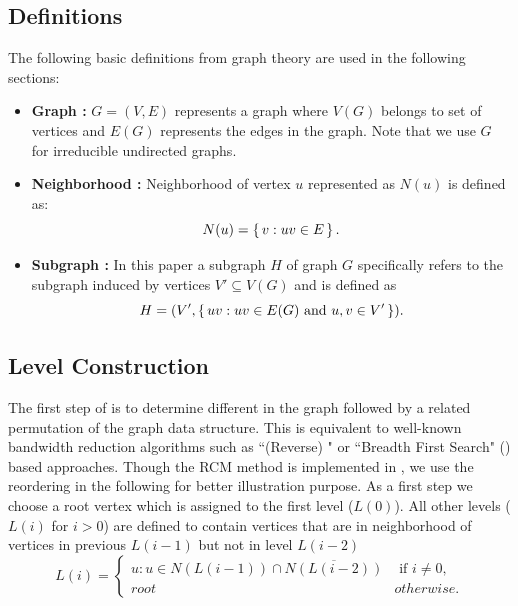 \subsection*{Definitions}
The following basic definitions from graph theory are used in the following sections:
\begin{itemize}
	\item \textbf{Graph : } $G = (V,E)$ represents a graph where $V(G)$ belongs to set of vertices and $E(G)$ represents the edges in the graph. Note that we use $G$ for irreducible undirected graphs.
	\item \textbf{Neighborhood :} Neighborhood of vertex $u$ represented as $N(u)$ is defined as:
	\begin{equation*}
	  N(u) = \set{ v : uv \in E}.
	\end{equation*}
	\item \textbf{Subgraph :} In this paper a subgraph $H$ of graph $G$ specifically refers to the subgraph induced by vertices $V' \subseteq V(G)$ and is defined as
	\begin{equation*}
		H = (V', \set{ uv : uv \in E(G) \text{ and } u,v \in V'}).
	\end{equation*}
\end{itemize}

\subsection{Level Construction}\label{subsec:LEVEL_CONST}
The first step of \RACE is to determine different \levels in the graph followed by a related permutation of the graph data structure. This is equivalent to well-known bandwidth reduction algorithms such as ``(Reverse) \CMfull" or ``Breadth First Search" (\BFS) \cite{BFS} based approaches. Though the RCM method is implemented in \RACE, we use the  \BFS reordering in the following for better illustration purpose.
As a first step we choose a root vertex which is assigned to the first level ($L(0)$). All other levels ($L(i)$ for $i > 0$) are defined to  contain vertices that are in neighborhood of vertices in previous \level $L(i-1)$ but not in level $L(i-2)$ \cite{BFS_level_def} \ie
\begin{equation}\label{eq:level}
L(i) = 
\begin{cases}
	  u : u \in N(L(i-1)) \cap \overline{N(L(i-2))}  & \text{ if } i \neq 0, \\
	 root & otherwise.
\end{cases}   
\end{equation}


